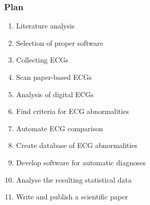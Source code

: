 \documentclass[a4paper, 12pt, reqno]{article}
\begin{document}
\subsubsection*{Plan}
\begin{enumerate}
    \item Literature analysis
    \item Selection of proper software
    \item Collecting ECGs
    \item Scan paper-based ECGs
    \item Analysis of digital ECGs
    \item Find criteria for ECG abnormalities
    \item Automate ECG comparison
    \item Create database of ECG abnormalities
    \item Develop software for automatic diagnoses
    \item Analyse the resulting statistical data
    \item Write and publish a scientific paper
\end{enumerate}

\nocite{*}
\renewcommand{\refname}{\normalsize References}
\small


\end{document}
